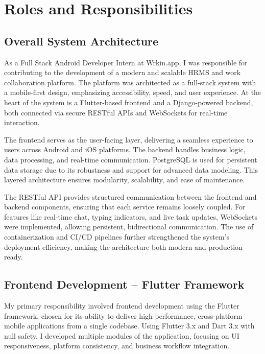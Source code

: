 \chapter{Roles and Responsibilities}

\section{Overall System Architecture}

As a Full Stack Android Developer Intern at Wrkin.app, I was responsible for contributing to the development of a modern and scalable HRMS and work collaboration platform. The platform was architected as a full-stack system with a mobile-first design, emphasizing accessibility, speed, and user experience. At the heart of the system is a Flutter-based frontend and a Django-powered backend, both connected via secure RESTful APIs and WebSockets for real-time interaction.

The frontend serves as the user-facing layer, delivering a seamless experience to users across Android and iOS platforms. The backend handles business logic, data processing, and real-time communication. PostgreSQL is used for persistent data storage due to its robustness and support for advanced data modeling. This layered architecture ensures modularity, scalability, and ease of maintenance.

The RESTful API provides structured communication between the frontend and backend components, ensuring that each service remains loosely coupled. For features like real-time chat, typing indicators, and live task updates, WebSockets were implemented, allowing persistent, bidirectional communication. The use of containerization and CI/CD pipelines further strengthened the system's deployment efficiency, making the architecture both modern and production-ready.

\section{Frontend Development – Flutter Framework}

My primary responsibility involved frontend development using the Flutter framework, chosen for its ability to deliver high-performance, cross-platform mobile applications from a single codebase. Using Flutter 3.x and Dart 3.x with null safety, I developed multiple modules of the application, focusing on UI responsiveness, platform consistency, and business workflow integration.

